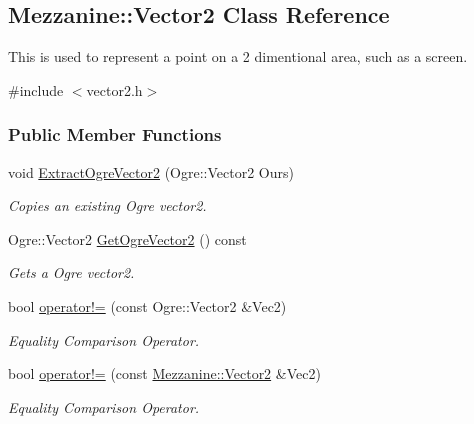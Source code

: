 \hypertarget{classMezzanine_1_1Vector2}{
\subsection{Mezzanine::Vector2 Class Reference}
\label{classMezzanine_1_1Vector2}
}


This is used to represent a point on a 2 dimentional area, such as a screen.  




{\ttfamily \#include $<$vector2.h$>$}

\subsubsection*{Public Member Functions}
\begin{DoxyCompactItemize}
\item 
void \hyperlink{classMezzanine_1_1Vector2_a122b3ce34c1afea300ddcae158fca294}{ExtractOgreVector2} (Ogre::Vector2 Ours)
\begin{DoxyCompactList}\small\item\em Copies an existing Ogre vector2. \item\end{DoxyCompactList}\item 
Ogre::Vector2 \hyperlink{classMezzanine_1_1Vector2_a7d98428699beefd90861cd44ab125083}{GetOgreVector2} () const 
\begin{DoxyCompactList}\small\item\em Gets a Ogre vector2. \item\end{DoxyCompactList}\item 
bool \hyperlink{classMezzanine_1_1Vector2_a0f8d828c2bcce1bd568fe11b44d83901}{operator!=} (const Ogre::Vector2 \&Vec2)
\begin{DoxyCompactList}\small\item\em Equality Comparison Operator. \item\end{DoxyCompactList}\item 
bool \hyperlink{classMezzanine_1_1Vector2_ae777558f9f198bf3523e6fabb22e7b3f}{operator!=} (const \hyperlink{classMezzanine_1_1Vector2}{Mezzanine::Vector2} \&Vec2)
\begin{DoxyCompactList}\small\item\em Equality Comparison Operator. \item\end{DoxyCompactList}\item 

\end{DoxyCompactItemize}
